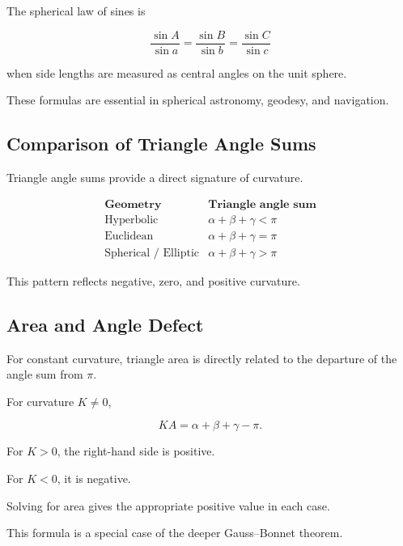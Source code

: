 The spherical law of sines is

\[
\boxed{
\frac{\sin A}{\sin a}
=
\frac{\sin B}{\sin b}
=
\frac{\sin C}{\sin c}
}
\]

when side lengths are measured as central angles on the unit sphere.

These formulas are essential in spherical astronomy, geodesy, and
navigation.

\subsection{Comparison of Triangle Angle Sums}
\label{subsec:triangle-angle-sum-comparison}

Triangle angle sums provide a direct signature of curvature.

\[
\boxed{
\begin{array}{c|c}
\textbf{Geometry} & \textbf{Triangle angle sum}\\
\hline
\text{Hyperbolic} &
\alpha+\beta+\gamma<\pi\\
\text{Euclidean} &
\alpha+\beta+\gamma=\pi\\
\text{Spherical / Elliptic} &
\alpha+\beta+\gamma>\pi
\end{array}
}
\]

This pattern reflects negative, zero, and positive curvature.

\subsection{Area and Angle Defect}
\label{subsec:area-angle-defect}

For constant curvature, triangle area is directly related to the departure
of the angle sum from \(\pi\).

For curvature \(K\neq0\),

\[
\boxed{
K A
=
\alpha+\beta+\gamma-\pi.
}
\]

For \(K>0\), the right-hand side is positive.

For \(K<0\), it is negative.

Solving for area gives the appropriate positive value in each case.

This formula is a special case of the deeper Gauss--Bonnet theorem.

